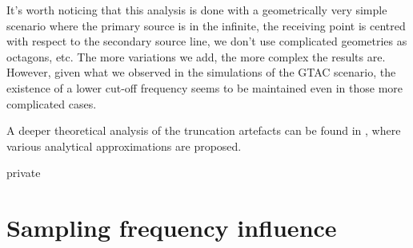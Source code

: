It's worth noticing that this analysis is done with a geometrically very simple scenario where the primary source is in the infinite, the receiving point is centred with respect to the secondary source line, we don't use complicated geometries as octagons, etc. The more variations we add, the more complex the results are. However, given what we observed in the simulations of the GTAC scenario, the existence of a lower cut-off frequency seems to be maintained even in those more complicated cases.

A deeper theoretical analysis of the truncation artefacts can be found in \cite[Section 4.3]{Start1997}, where various analytical approximations are proposed.

\begin{shownto}{private}
\section{Sampling frequency influence}
\end{shownto}